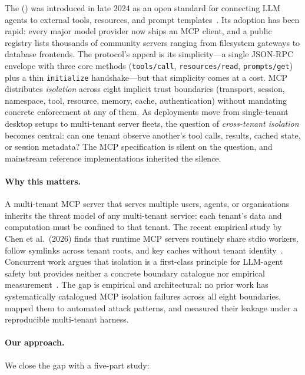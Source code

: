
The \mcp{} (\mcp{}) was introduced in late 2024 as an open
standard for connecting LLM agents to external tools, resources,
and prompt templates~\cite{mcp_spec,anthropic_mcp_announce}. Its
adoption has been rapid: every major model provider now ships an
MCP client, and a public registry lists thousands of community
servers ranging from filesystem gateways to database frontends.
The protocol's appeal is its simplicity---a single JSON-RPC
envelope with three core methods (\texttt{tools/call},
\texttt{resources/read}, \texttt{prompts/get}) plus a thin
\texttt{initialize} handshake---but that simplicity comes at a
cost. MCP distributes \emph{isolation} across eight implicit
trust boundaries (transport, session, namespace, tool, resource,
memory, cache, authentication) without mandating concrete
enforcement at any of them. As deployments move from
single-tenant desktop setups to multi-tenant server fleets, the
question of \emph{cross-tenant isolation} becomes central: can
one tenant observe another's tool calls, results, cached state,
or session metadata? The MCP specification is silent on the
question, and mainstream reference implementations inherited the
silence.

\paragraph{Why this matters.}
A multi-tenant MCP server that serves multiple users, agents, or
organisations inherits the threat model of any multi-tenant
service: each tenant's data and computation must be confined to
that tenant. The recent empirical study by Chen et al.~(2026)
finds that runtime MCP servers routinely share stdio workers,
follow symlinks across tenant roots, and key caches without
tenant identity~\cite{chen_2026_mcp_security}. Concurrent work
argues that isolation is a first-class principle for LLM-agent
safety but provides neither a concrete boundary catalogue nor
empirical measurement~\cite{jing_2026_isolation}. The gap is
empirical and architectural: no prior work has systematically
catalogued MCP isolation failures across all eight boundaries,
mapped them to automated attack patterns, and measured their
leakage under a reproducible multi-tenant harness.

\paragraph{Our approach.}
We close the gap with a five-part study:

